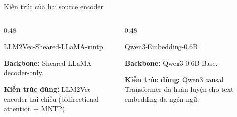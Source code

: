 \documentclass[aspectratio=169,11pt]{beamer}
\begin{document}
\begin{frame}{Kiến trúc của hai source encoder}
  \begin{columns}[T,onlytextwidth]
    \begin{column}{0.48\textwidth}
      \begin{block}{LLM2Vec-Sheared-LLaMA-mntp}
        \begin{minipage}[t][1.72cm][t]{\linewidth}\small\raggedright
        \textbf{Backbone:} Sheared-LLaMA decoder-only.

        \vspace{0.35em}
        \textbf{Kiến trúc dùng:} LLM2Vec encoder hai chiều (bidirectional attention + MNTP).
        \end{minipage}
      \end{block}
    \end{column}
    \hfill
    \begin{column}{0.48\textwidth}
      \begin{exampleblock}{Qwen3-Embedding-0.6B}
        \begin{minipage}[t][1.72cm][t]{\linewidth}\small\raggedright
        \textbf{Backbone:} Qwen3-0.6B-Base.

        \vspace{0.35em}
        \textbf{Kiến trúc dùng:} Qwen3 causal Transformer đã huấn luyện cho text embedding đa ngôn ngữ.
        \end{minipage}
      \end{exampleblock}
    \end{column}
  \end{columns}

\end{frame}
\end{document}
